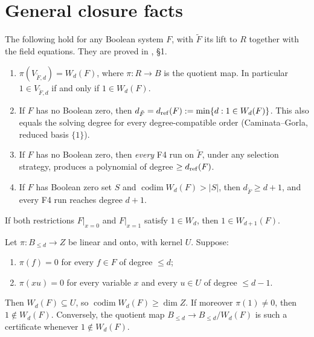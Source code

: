 \section{General closure facts}

The following hold for any Boolean system $F$, with $\tilde F$ its lift to
$R$ together with the field equations. They are proved in
, \S1.

\begin{proposition}[Bridges]\label{prop:bridges}
\begin{enumerate}
\item $\pi(V_{\tilde F,d})=W_d(F)$, where $\pi:R\to B$ is the quotient map.
  In particular $1\in V_{\tilde F,d}$ if and only if $1\in W_d(F)$.
\item If $F$ has no Boolean zero, then
  $d_{\tilde F}=d_{\rm ref}(F):=\min\{d:1\in W_d(F)\}$. This also equals
  the solving degree for every degree-compatible order (Caminata--Gorla,
  reduced basis $\{1\}$).
\item If $F$ has no Boolean zero, then \emph{every} F4 run on $\tilde F$,
  under any selection strategy, produces a polynomial of degree
  $\ge d_{\rm ref}(F)$.
\item If $F$ has Boolean zero set $S$ and
  $\operatorname{codim}W_d(F)>|S|$, then $d_{\tilde F}\ge d+1$, and every
  F4 run reaches degree $d+1$.
\end{enumerate}
\end{proposition}

\begin{lemma}[Branching]\label{lem:branch}
If both restrictions $F|_{x=0}$ and $F|_{x=1}$ satisfy $1\in W_d$, then
$1\in W_{d+1}(F)$.
\end{lemma}

\begin{proposition}\label{prop:cert}
Let $\pi:B_{\le d}\to Z$ be linear and onto, with kernel $U$. Suppose:
\begin{enumerate}
\item[(i)] $\pi(f)=0$ for every $f\in F$ of degree $\le d$;
\item[(ii)] $\pi(xu)=0$ for every variable $x$ and every $u\in U$ of degree
  $\le d-1$.
\end{enumerate}
Then $W_d(F)\subseteq U$, so $\operatorname{codim}W_d(F)\ge\dim Z$. If
moreover $\pi(1)\ne0$, then $1\notin W_d(F)$. Conversely, the quotient map
$B_{\le d}\to B_{\le d}/W_d(F)$ is such a certificate whenever
$1\notin W_d(F)$.
\end{proposition}


